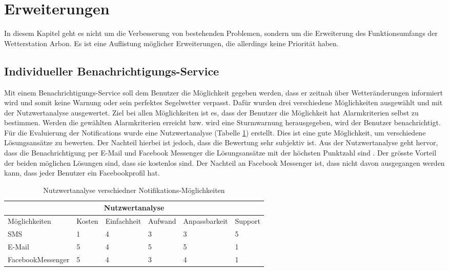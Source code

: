 \section{Erweiterungen}
In diesem Kapitel geht es nicht um die Verbesserung von bestehenden Problemen, sondern um die Erweiterung des Funktionsumfangs der Wetterstation Arbon. Es ist eine Auflistung möglicher Erweiterungen, die allerdings keine Priorität haben.

\subsection{Individueller Benachrichtigungs-Service}
Mit einem Benachrichtigungs-Service soll dem Benutzer die Möglichkeit gegeben werden, dass er zeitnah über Wetteränderungen informiert wird und somit keine Warnung oder sein perfektes Segelwetter verpasst. Dafür wurden drei verschiedene Möglichkeiten ausgewählt und mit der Nutzwertanalyse ausgewertet. Ziel bei allen Möglichkeiten ist es, dass der Benutzer die Möglichkeit hat Alarmkriterien selbst zu bestimmen. Werden die gewählten Alarmkriterien erreicht bzw. wird eine Sturmwarnung herausgegeben, wird der Benutzer benachrichtigt. Für die Evaluierung der Notifications wurde eine Nutzwertanalyse (Tabelle \ref{table:nutzwertanalyse}) erstellt. Dies ist eine gute Möglichkeit, um verschiedene Lösungsansätze zu bewerten. Der Nachteil hierbei ist jedoch, dass die Bewertung sehr subjektiv ist. Aus der Nutzwertanalyse geht hervor, dass die Benachrichtigung per E-Mail und Facebook Messenger die Lösungsansätze mit der höchsten Punktzahl sind . Der grösste Vorteil der beiden möglichen Lösungen sind, dass sie kostenlos sind. Der Nachteil an Facebook Messenger ist, dass nicht davon ausgegangen werden kann, dass jeder Benutzer ein Facebookprofil hat. 

\begin{table}
\begin{center}
\begin{tabular}{ |p{3.5cm}||p{1.1cm}|p{2cm}|p{1.7cm}|p{2.3cm}|p{1.4cm}|}
 \hline
 \multicolumn{6}{|c|}{Nutzwertanalyse} \\
 \hline
	Möglichkeiten & Kosten & Einfachheit & Aufwand & Anpassbarkeit & Support\\
 \hline
	SMS & 1 & 4 & 3 & 3 & 5\\
	E-Mail & 5 & 4 & 5 & 5 & 1\\
	FacebookMessenger & 5 & 4 & 3 & 4 & 1\\
 
\hline
\end{tabular}
\end{center}
\caption{Nutzwertanalyse verschiedner Notifikations-Möglichkeiten}
\label{table:nutzwertanalyse}
\end{table}


